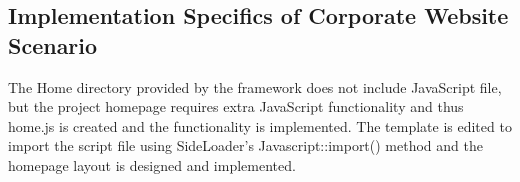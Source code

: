 \subsection{Implementation Specifics of Corporate Website Scenario}\label{subsec:implementation-specifics-of-corporate-website-scenario}
The Home directory provided by the framework does not include JavaScript file,
but the project homepage requires extra JavaScript functionality and thus home.js is created
and the functionality is implemented.
The template is edited to import the script file using SideLoader's Javascript::import() method and the homepage layout
is designed and implemented.


